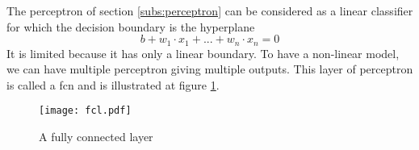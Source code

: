 The perceptron of section \ref{subs:perceptron} can be considered as a linear classifier for which the decision boundary is the hyperplane
$$ b + w_1 \cdot x_1 + ... + w_n \cdot x_n = 0$$
It is limited because it has only a linear boundary. To have a non-linear model, we can have multiple perceptron giving multiple outputs. This layer of perceptron is called a \acrfull{fcn} and is illustrated at figure \ref{fig:fcn}.
\begin{figure}
    \centering
    \texttt{[image: fcl.pdf]}
    \caption{A fully connected layer}
    \label{fig:fcn}
\end{figure}
